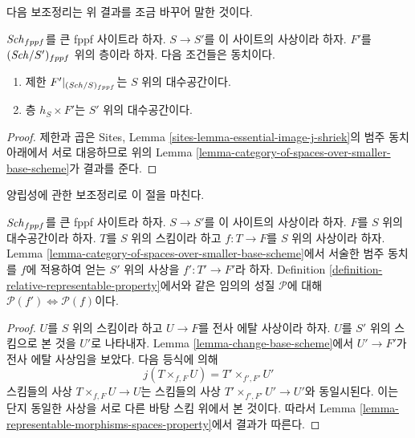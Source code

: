 \noindent
다음 보조정리는 위 결과를 조금 바꾸어 말한 것이다.

\begin{lemma}
\label{lemma-rephrase}
$\mathit{Sch}_{fppf}$를 큰 fppf 사이트라 하자.
$S \to S'$를 이 사이트의 사상이라 하자.
$F'$를 $(\mathit{Sch}/S')_{fppf}$ 위의 층이라 하자.
다음 조건들은 동치이다.
\begin{enumerate}
\item 제한 $F'|_{(\mathit{Sch}/S)_{fppf}}$는 $S$ 위의 대수공간이다.
\item 층 $h_S \times F'$는 $S'$ 위의 대수공간이다.
\end{enumerate}
\end{lemma}

\begin{proof}
제한과 곱은 Sites, Lemma
\ref{sites-lemma-essential-image-j-shriek}의 범주 동치 아래에서
서로 대응하므로 위의 Lemma
\ref{lemma-category-of-spaces-over-smaller-base-scheme}가
결과를 준다.
\end{proof}

\noindent
양립성에 관한 보조정리로 이 절을 마친다.

\begin{lemma}
\label{lemma-viewed-as-properties}
$\mathit{Sch}_{fppf}$를 큰 fppf 사이트라 하자.
$S \to S'$를 이 사이트의 사상이라 하자.
$F$를 $S$ 위의 대수공간이라 하자.
$T$를 $S$ 위의 스킴이라 하고 $f : T \to F$를 $S$ 위의
사상이라 하자.
Lemma \ref{lemma-category-of-spaces-over-smaller-base-scheme}에서
서술한 범주 동치를 $f$에 적용하여 얻는 $S'$ 위의 사상을
$f' : T' \to F'$라 하자.
Definition \ref{definition-relative-representable-property}에서와 같은
임의의 성질 $\mathcal{P}$에 대해
$\mathcal{P}(f') \Leftrightarrow \mathcal{P}(f)$이다.
\end{lemma}

\begin{proof}
$U$를 $S$ 위의 스킴이라 하고 $U \to F$를 전사 에탈 사상이라 하자.
$U$를 $S'$ 위의 스킴으로 본 것을 $U'$로 나타내자.
Lemma \ref{lemma-change-base-scheme}에서
$U' \to F'$가 전사 에탈 사상임을 보았다. 다음 등식에 의해
$$
j(T \times_{f, F} U) = T' \times_{f', F'} U'
$$
스킴들의 사상 $T \times_{f, F} U \to U$는 스킴들의 사상
$T' \times_{f', F'} U' \to U'$와 동일시된다.
이는 단지 동일한 사상을 서로 다른 바탕 스킴 위에서 본 것이다.
따라서 Lemma \ref{lemma-representable-morphisms-spaces-property}에서
결과가 따른다.
\end{proof}















